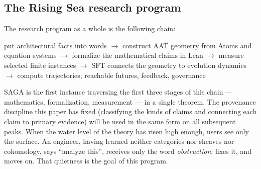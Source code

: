 \subsection{The Rising Sea research program}\label{sec:96}

The research program as a whole is the following chain:
\begin{center}
\small
put architectural facts into words
$\to$ construct AAT geometry from Atoms and equation systems
$\to$ formalize the mathematical claims in Lean
$\to$ measure selected finite instances
$\to$ SFT connects the geometry to evolution dynamics
$\to$ compute trajectories, reachable futures, feedback, governance
\end{center}

SAGA is the first instance traversing the first three stages of this
chain --- mathematics, formalization, measurement --- in a single
theorem. The provenance discipline this paper has fixed (classifying
the kinds of claims and connecting each claim to primary evidence)
will be used in the same form on all subsequent peaks. When the water
level of the theory has risen high enough, users see only the surface.
An engineer, having learned neither categories nor sheaves nor
cohomology, says ``analyze this'', receives only the word
\emph{obstruction}, fixes it, and moves on. That quietness is the goal
of this program.
